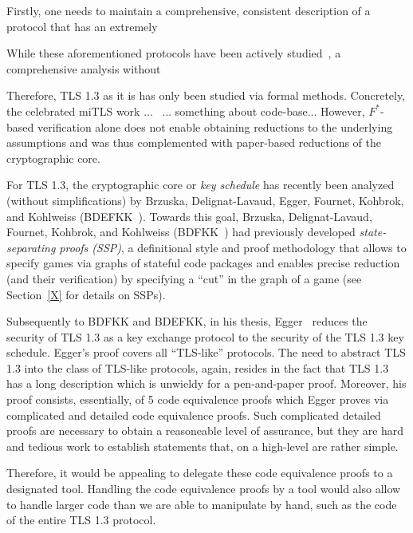 
Firstly, one needs to maintain a comprehensive, consistent description of
a protocol that has an extremely 



While these aforementioned protocols have been actively studied~\cite{X}, a comprehensive analysis without 


Therefore, TLS 1.3 as it is has only been studied via formal methods. Concretely, the celebrated miTLS work ...~\cite{X} ... something about code-base... However, $F^*$-based verification alone does not enable obtaining reductions to the underlying assumptions and was thus complemented with paper-based reductions of the cryptographic core.

For TLS 1.3, the cryptographic core or \emph{key schedule} has recently been analyzed (without simplifications) by Brzuska, Delignat-Lavaud, Egger, Fournet, Kohbrok, and Kohlweiss (BDEFKK~\cite{X}).
Towards this goal, Brzuska, Delignat-Lavaud, Fournet, Kohbrok, and Kohlweiss (BDFKK~\cite{X}) had previously developed \emph{state-separating proofs (SSP)}, a definitional style and proof methodology that allows to specify games via graphs of stateful code packages and enables precise reduction (and their verification) by
specifying a ``cut'' in the graph of a game (see Section~\ref{X} for details on SSPs).

Subsequently to BDFKK and BDEFKK, in his thesis, Egger~\cite{X} reduces the security of TLS 1.3 as a key exchange protocol to the security of the TLS 1.3 key schedule. Egger's proof covers all ``TLS-like'' protocols. The need to abstract TLS 1.3 into the class of TLS-like protocols, again, resides in the fact that TLS 1.3 has a long description which is unwieldy for a pen-and-paper proof. Moreover, his proof consists, essentially, of 5 code equivalence proofs which Egger proves via complicated and detailed code equivalence proofs. Such complicated detailed proofs are necessary to obtain a reasoneable level of assurance, but they are hard and tedious work to establish statements that, on a high-level are rather simple.

Therefore, it would be appealing to delegate these code equivalence proofs to
a designated tool. Handling the code equivalence proofs by a tool would also
allow to handle larger code than we are able to manipulate by hand, such as the
code of the entire TLS 1.3 protocol.

